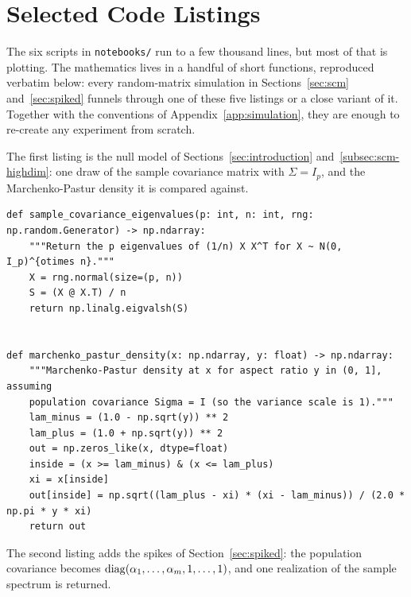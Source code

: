 
\section{Selected Code Listings}\label{app:code}

The six scripts in \texttt{notebooks/} run to a few thousand lines, but most of that is plotting. The mathematics lives in a handful of short functions, reproduced verbatim below: every random-matrix simulation in Sections~\ref{sec:scm} and~\ref{sec:spiked} funnels through one of these five listings or a close variant of it. Together with the conventions of Appendix~\ref{app:simulation}, they are enough to re-create any experiment from scratch.

\medskip

The first listing is the null model of Sections~\ref{sec:introduction} and~\ref{subsec:scm-highdim}: one draw of the sample covariance matrix with \(\Sigma = I_p\), and the Marchenko-Pastur density it is compared against.

\begin{lstlisting}[caption={Null-model eigenvalues and the Marchenko-Pastur density (from \texttt{00\_intro\_lowdim\_vs\_highdim.py}; reused throughout Section~\ref{sec:scm}).}, label={lst:mp-bulk}]
def sample_covariance_eigenvalues(p: int, n: int, rng: np.random.Generator) -> np.ndarray:
    """Return the p eigenvalues of (1/n) X X^T for X ~ N(0, I_p)^{otimes n}."""
    X = rng.normal(size=(p, n))
    S = (X @ X.T) / n
    return np.linalg.eigvalsh(S)


def marchenko_pastur_density(x: np.ndarray, y: float) -> np.ndarray:
    """Marchenko-Pastur density at x for aspect ratio y in (0, 1], assuming
    population covariance Sigma = I (so the variance scale is 1)."""
    lam_minus = (1.0 - np.sqrt(y)) ** 2
    lam_plus = (1.0 + np.sqrt(y)) ** 2
    out = np.zeros_like(x, dtype=float)
    inside = (x >= lam_minus) & (x <= lam_plus)
    xi = x[inside]
    out[inside] = np.sqrt((lam_plus - xi) * (xi - lam_minus)) / (2.0 * np.pi * y * xi)
    return out
\end{lstlisting}

The second listing adds the spikes of Section~\ref{sec:spiked}: the population covariance becomes \(\operatorname{diag}(\alpha_1, \dots, \alpha_m, 1, \dots, 1)\), and one realization of the sample spectrum is returned.

